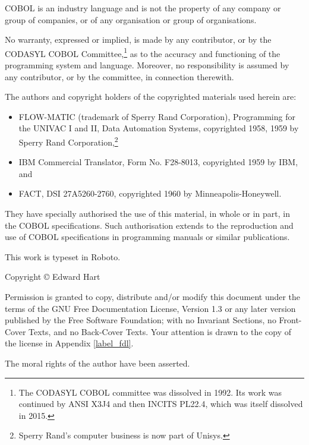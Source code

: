 \documentclass[a4paper,oneside,svgnames]{scrbook}
\begin{document}
\vspace*{\fill}

COBOL is an industry language and is not the property of any company or group of companies, or of any organisation or group of organisations.

No warranty, expressed or implied, is made by any contributor, or by the CODASYL COBOL Committee,\footnote{The CODASYL COBOL committee was dissolved in 1992. Its work was continued by ANSI X3J4 and then INCITS PL22.4, which was itself dissolved in 2015.} as to the accuracy and functioning of the programming system and language. Moreover, no responsibility is assumed by any contributor, or by the committee, in connection therewith.

The authors and copyright holders of the copyrighted materials used herein are:
\begin{itemize}
\item FLOW-MATIC (trademark of Sperry Rand Corporation), Programming for the UNIVAC \textregistered{} I and II, Data Automation Systems, copyrighted 1958, 1959 by Sperry Rand Corporation,\footnote{Sperry Rand's computer business is now part of Unisys.}
\item IBM Commercial Translator, Form No. F28-8013, copyrighted 1959 by IBM, and
\item FACT, DSI 27A5260-2760, copyrighted 1960 by Minneapolis-Honeywell.
\end{itemize}

They have specially authorised the use of this material, in whole or in part, in the COBOL specifications. Such authorisation extends to the reproduction and use of COBOL specifications in programming manuals or similar publications.

\vfill

\begin{center}
  This work is typeset in Roboto.
\end{center}


\vfill

\begin{center}
  Copyright \copyright{} \the\year{} Edward Hart

\vspace{5pt}

Permission is granted to copy, distribute and\slash{}or modify this document under the terms of the GNU Free Documentation License, Version 1.3 or any later version published by the Free Software Foundation; with no Invariant Sections, no Front-Cover Texts, and no Back-Cover Texts. Your attention is drawn to the copy of the license in Appendix \ref{label_fdl}.
\vspace{5pt}

  The moral rights of the author have been asserted.
\end{center}
\end{document}
